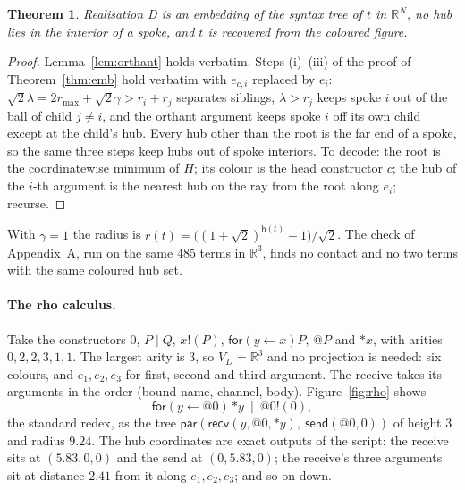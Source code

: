 \documentclass[11pt]{article}
\newtheorem{theorem}{Theorem}
\theoremstyle{definition}
\theoremstyle{remark}
\newcommand{\R}{\mathbb{R}}
\newcommand{\rad}{r}
\newcommand{\hgt}{\mathsf{h}}
\begin{document}
\begin{theorem}\label{thm:D}
Realisation D is an embedding of the syntax tree of $t$ in $\R^N$, no hub lies in
the interior of a spoke, and $t$ is recovered from the coloured figure.
\end{theorem}
\begin{proof}
Lemma~\ref{lem:orthant} holds verbatim. Steps (i)--(iii) of the proof of
Theorem~\ref{thm:emb} hold verbatim with $e_{c,i}$ replaced by $e_i$:
$\sqrt2\lambda=2\rad_{\max}+\sqrt2\gamma>\rad_i+\rad_j$ separates siblings,
$\lambda>\rad_j$ keeps spoke $i$ out of the ball of child $j\ne i$, and the
orthant argument keeps spoke $i$ off its own child except at the child's hub.
Every hub other than the root is the far end of a spoke, so the same three steps
keep hubs out of spoke interiors. To decode: the root is the coordinatewise
minimum of $H$; its colour is the head constructor $c$; the hub of the $i$-th
argument is the nearest hub on the ray from the root along $e_i$; recurse.
\end{proof}

With $\gamma=1$ the radius is $\rad(t)=\bigl((1+\sqrt2)^{\hgt(t)}-1\bigr)/\sqrt2$.
The check of Appendix~A, run on the same $485$ terms in $\R^3$, finds no contact
and no two terms with the same coloured hub set.

\paragraph{The rho calculus.} Take the constructors $0$, $P\mid Q$, $x!(P)$,
$\mathsf{for}(y\leftarrow x)P$, $@P$ and $*x$, with arities $0,2,2,3,1,1$. The
largest arity is $3$, so $V_D=\R^3$ and no projection is needed: six colours, and
$e_1,e_2,e_3$ for first, second and third argument. The receive takes its
arguments in the order (bound name, channel, body).
Figure~\ref{fig:rho} shows
\[
\mathsf{for}(y\leftarrow @0)\,{*y}\ \mid\ @0!(0),
\]
the standard redex, as the tree
$\mathsf{par}(\mathsf{recv}(y,@0,{*y}),\ \mathsf{send}(@0,0))$ of height $3$ and
radius $9.24$. The hub coordinates are exact outputs of the script:
the receive sits at $(5.83,0,0)$ and the send at $(0,5.83,0)$; the receive's three
arguments sit at distance $2.41$ from it along $e_1,e_2,e_3$; and so on down.
\end{document}
